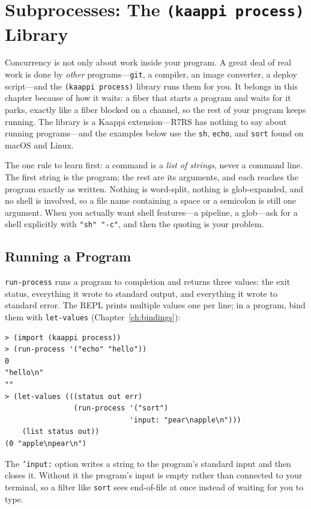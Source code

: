 \section{Subprocesses: The \texttt{(kaappi process)} Library}
\label{sec:subprocesses}

Concurrency is not only about work inside your program. A great deal of real work is done by \emph{other} programs---\texttt{git}, a compiler, an image converter, a deploy script---and the \texttt{(kaappi process)} library runs them for you. It belongs in this chapter because of how it waits: a fiber that starts a program and waits for it parks, exactly like a fiber blocked on a channel, so the rest of your program keeps running. The library is a Kaappi extension---R7RS has nothing to say about running programs---and the examples below use the \texttt{sh}, \texttt{echo}, and \texttt{sort} found on macOS and Linux.

The one rule to learn first: a command is a \emph{list of strings}, never a command line. The first string is the program; the rest are its arguments, and each reaches the program exactly as written. Nothing is word-split, nothing is glob-expanded, and no shell is involved, so a file name containing a space or a semicolon is still one argument. When you actually want shell features---a pipeline, a glob---ask for a shell explicitly with \texttt{"sh" "-c"}, and then the quoting is your problem.

\subsection{Running a Program}

\texttt{run-process} runs a program to completion and returns three values: the exit status, everything it wrote to standard output, and everything it wrote to standard error. The REPL prints multiple values one per line; in a program, bind them with \texttt{let-values} (Chapter~\ref{ch:bindings}):

\begin{lstlisting}[style=repl]
> (import (kaappi process))
> (run-process '("echo" "hello"))
0
"hello\n"
""
> (let-values (((status out err)
                (run-process '("sort")
                             'input: "pear\napple\n")))
    (list status out))
(0 "apple\npear\n")
\end{lstlisting}

The \texttt{'input:} option writes a string to the program's standard input and then closes it. Without it the program's input is empty rather than connected to your terminal, so a filter like \texttt{sort} sees end-of-file at once instead of waiting for you to type.

